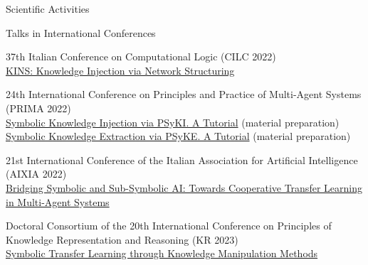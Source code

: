 \documentclass{resume} %
\begin{document}
\begin{rSection}{Scientific Activities}
        \begin{rSubsection2}{Talks in International Conferences}
            \item 37th Italian Conference on Computational Logic (CILC 2022)
            \\\href{https://apice.unibo.it/xwiki/bin/view/Talk/KinsCilc2022}{KINS: Knowledge Injection via Network Structuring}
            \item 24th International Conference on Principles and Practice of Multi-Agent Systems (PRIMA 2022)
            \\\href{https://apice.unibo.it/xwiki/bin/view/Talk/PsykitutorialPrima2022}{Symbolic Knowledge Injection via PSyKI. A Tutorial} (material preparation)
            \\\href{https://apice.unibo.it/xwiki/bin/view/Talk/PsykiPrima2022}{Symbolic Knowledge Extraction via PSyKE. A Tutorial} (material preparation)
            \item 21st International Conference of the Italian Association for Artificial Intelligence (AIXIA 2022)
            \\\href{https://apice.unibo.it/xwiki/bin/view/Talk/CtlAixia2022}{Bridging Symbolic and Sub-Symbolic AI: Towards Cooperative Transfer Learning in Multi-Agent Systems}
            \item Doctoral Consortium of the 20th International Conference on Principles of Knowledge Representation and Reasoning (KR 2023)
            \\\href{https://apice.unibo.it/xwiki/bin/view/Talk/SymbolicTransferLearning}{Symbolic Transfer Learning through Knowledge Manipulation Methods}
        \end{rSubsection2}


\end{rSection}
\end{document}
